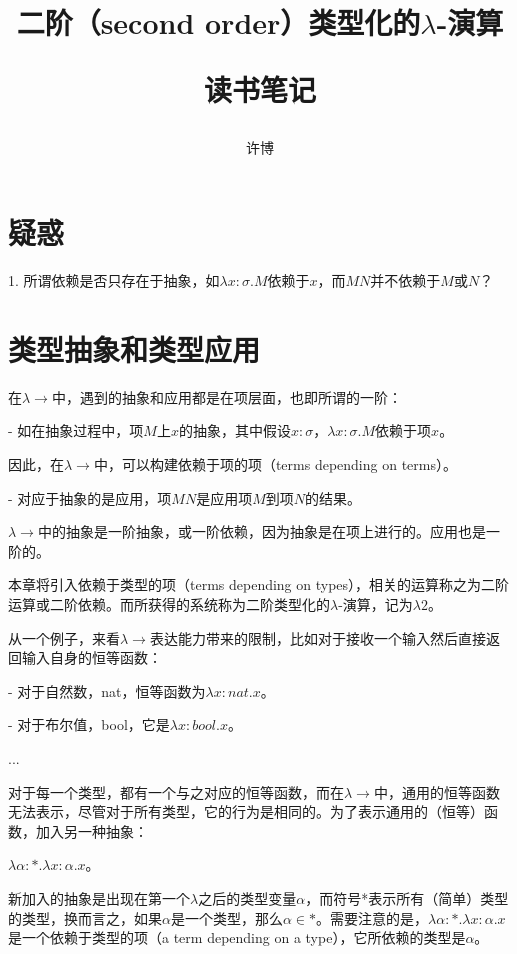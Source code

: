 \documentclass[UTF8]{article}
\title{二阶（second order）类型化的$\lambda$-演算\\[2ex]\begin{large}读书笔记\end{large}}
\author{许博}
\date{}
\begin{document}
\maketitle
	\section{疑惑}
	
	1. 所谓依赖是否只存在于抽象，如$\lambda x:\sigma.M$依赖于$x$，而$MN$并不依赖于$M$或$N$？

	\section{类型抽象和类型应用}
		\noindent
		在$\lambda{\rightarrow}$中，遇到的抽象和应用都是在项层面，也即所谓的一阶：
		
		\noindent
		- 如在抽象过程中，项$M$上$x$的抽象，其中假设$x:\sigma$，$\lambda x:\sigma.M$依赖于项$x$。
		
		因此，在$\lambda{\rightarrow}$中，可以构建依赖于项的项（terms depending on terms）。
			
		\noindent
		- 对应于抽象的是应用，项$MN$是应用项$M$到项$N$的结果。
		
		$\lambda{\rightarrow}$中的抽象是一阶抽象，或一阶依赖，因为抽象是在项上进行的。应用也是一阶的。
		
		本章将引入依赖于类型的项（terms depending on types），相关的运算称之为二阶运算或二阶依赖。而所获得的系统称为二阶类型化的$\lambda$-演算，记为$\lambda{2}$。
		
		从一个例子，来看$\lambda{\rightarrow}$表达能力带来的限制，比如对于接收一个输入然后直接返回输入自身的恒等函数：
		
		\noindent
		- 对于自然数，nat，恒等函数为$\lambda x:nat.x$。
		
		\noindent
		- 对于布尔值，bool，它是$\lambda x:bool.x$。
		
		\noindent ...
		
		对于每一个类型，都有一个与之对应的恒等函数，而在$\lambda{\rightarrow}$中，通用的恒等函数无法表示，尽管对于所有类型，它的行为是相同的。为了表示通用的（恒等）函数，加入另一种抽象：
		
		$\lambda\alpha:*.\lambda x:\alpha.x$。
		
		新加入的抽象是出现在第一个$\lambda$之后的类型变量$\alpha$，而符号*表示所有（简单）类型的类型，换而言之，如果$\alpha$是一个类型，那么$\alpha\in *$。需要注意的是，$\lambda\alpha:*.\lambda x:\alpha.x$是一个依赖于类型的项（a  term depending on a type），它所依赖的类型是$\alpha$。
		
\end{document}
